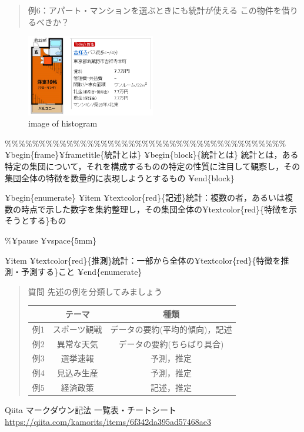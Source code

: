 \documentclass[
]{book}
\theoremstyle{definition}
\theoremstyle{definition}
\theoremstyle{definition}
\theoremstyle{definition}
\theoremstyle{remark}
\begin{document}
\begin{quote}
例6：アパート・マンションを選ぶときにも統計が使える
この物件を借りるべきか？
\end{quote}

\begin{figure}
\centering
\includegraphics[width=0.5\textwidth,height=\textheight]{images/lec01/fig_kichi_1room_example.png}
\caption{image of histogram}
\end{figure}

\%\%\%\%\%\%\%\%\%\%\%\%\%\%\%\%\%\%\%\%\%\%\%\%\%\%\%\%\%\%\%\%\%\%\%\%\%\%\%\%\%
¥begin\{frame\}¥frametitle\{統計とは\}
¥begin\{block\}\{統計とは\}
統計とは，ある特定の集団について，それを構成するものの特定の性質に注目して観察し，その集団全体の特徴を数量的に表現しようとするもの
¥end\{block\}

¥begin\{enumerate\}
¥item ¥textcolor\{red\}\{記述\}統計：複数の者，あるいは複数の時点で示した数字を集約整理し，その集団全体の¥textcolor\{red\}\{特徴を示そうとする\}もの

\%¥pause
¥vspace\{5mm\}

¥item ¥textcolor\{red\}\{推測\}統計：一部から全体の¥textcolor\{red\}\{特徴を推測・予測する\}こと
¥end\{enumerate\}

\begin{quote}
質問
先述の例を分類してみましょう

\begin{longtable}[]{@{}ccc@{}}
\toprule()
& テーマ & 種類 \\
\midrule()
\endhead
例1 & スポーツ観戦 & データの要約(平均的傾向)，記述 \\
例2 & 異常な天気 & データの要約(ちらばり具合) \\
例3 & 選挙速報 & 予測，推定 \\
例4 & 見込み生産 & 予測，推定 \\
例5 & 経済政策 & 記述，推定 \\
\bottomrule()
\end{longtable}
\end{quote}

Qiita マークダウン記法 一覧表・チートシート
\url{https://qiita.com/kamorits/items/6f342da395ad57468ae3}
\end{document}
